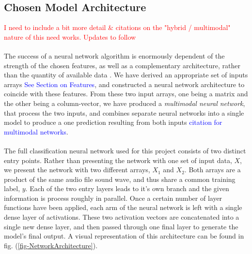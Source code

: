 \documentclass[12pt,letterpaper]{article}
\begin{document}

\subsection{Chosen Model Architecture}
\label{sec-Architecture}

\textcolor{red}{I need to include a bit more detail \& citations on the "hybrid / multimodal" nature of this need works. Updates to follow}

\paragraph*{}The success of a neural network algorithm is enormously dependent of the strength of the chosen features, as well as a complementary architecture, rather than the quantity of available data \cite{Geron,Kahn,Liu}. We have derived an appropriate set of inputs arrays \textcolor{blue}{See Section on Features}, and constructed a neural network architecture to coincide with these features. From these two input arrays, one being a matrix and the other being a column-vector, we have produced a \textit{multimodal neural network}, that process the two inputs, and combines separate neural networks into a single model to produce a one prediction resulting from both inputs \textcolor{blue}{citation for multimodal networks}.

\paragraph*{}The full classification neural network used for this project consists of two distinct entry points. Rather than presenting the network with one set of input data, $X$, we present the network with two different arrays, $X_1$ and $X_2$. Both arrays are a product of the same audio file sound wave, and thus share a common training label, $y$. Each of the two entry layers leads to it's own branch and the given information is process roughly in parallel. Once a certain number of layer functions have been applied, each arm of the neural network is left with a single dense layer of activations. These two activation vectors are concatenated into a single new dense layer, and then passed through one final layer to generate the model's final output. A visual representation of this architecture can be found in fig. (\ref{fig-NetworkArchitecture}).
\end{document}
